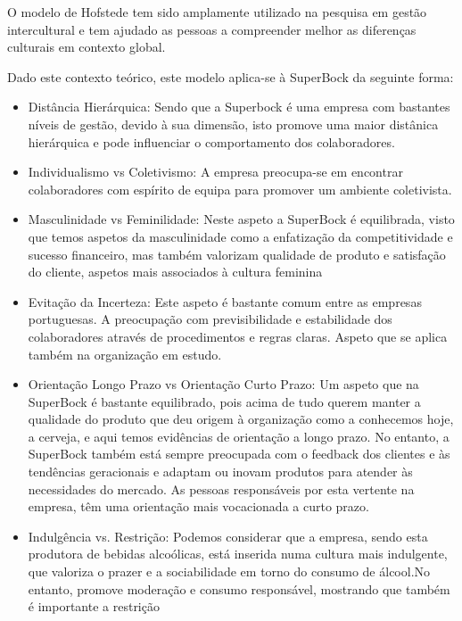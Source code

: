 O modelo de Hofstede tem sido amplamente utilizado na pesquisa em gestão intercultural e tem ajudado as pessoas a compreender melhor as diferenças culturais em contexto global.


Dado este contexto teórico, este modelo aplica-se à SuperBock da seguinte forma:
\noindent \textbf{}
\begin{itemize}

\item Distância Hierárquica: Sendo que a Superbock é uma empresa com bastantes níveis de gestão, devido à sua dimensão, isto promove uma maior distânica hierárquica e pode influenciar o comportamento dos colaboradores.

\item Individualismo vs Coletivismo: A empresa preocupa-se em encontrar colaboradores com espírito de equipa para promover um ambiente coletivista. 

\item Masculinidade vs Feminilidade: Neste aspeto a SuperBock é equilibrada, visto que temos aspetos da masculinidade como a enfatização da competitividade e sucesso financeiro, mas também valorizam qualidade de produto e satisfação do cliente, aspetos mais associados à cultura feminina

\item Evitação da Incerteza: Este aspeto é bastante comum entre as empresas portuguesas. A preocupação com previsibilidade e estabilidade dos colaboradores através de procedimentos e regras claras. Aspeto que se aplica também na organização em estudo.

\item Orientação Longo Prazo vs Orientação Curto Prazo: Um aspeto que na SuperBock é bastante equilibrado, pois acima de tudo querem manter a qualidade do produto que deu origem à organização como a conhecemos hoje, a cerveja, e aqui temos evidências de orientação a longo prazo. No entanto, a SuperBock também está sempre preocupada com o feedback dos clientes e às tendências geracionais e adaptam ou inovam produtos para atender às necessidades do mercado. As pessoas responsáveis por esta vertente na empresa, têm uma orientação mais vocacionada a curto prazo. 

\item Indulgência vs. Restrição: Podemos considerar que a empresa, sendo esta produtora de bebidas alcoólicas, está inserida numa cultura mais indulgente, que valoriza o prazer e a sociabilidade em torno do consumo de álcool.No entanto, promove moderação e consumo responsável, mostrando que também é importante a restrição
\end{itemize}

